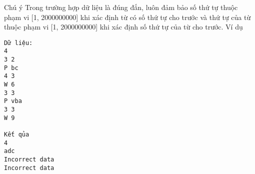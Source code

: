 Chú ý
Trong trường hợp dữ liệu là đúng đắn, luôn đảm bảo số thứ tự thuộc phạm vi [1, 2000000000] khi xác định từ có số thứ tự cho trước và thứ tự của từ thuộc phạm vi [1, 2000000000] khi xác định số thứ tự của từ cho trước.
Ví dụ
\begin{verbatim}
Dữ liệu:
4
3 2
P bc
4 3
W 6
3 3
P vba
3 3
W 9

Kết qủa
4
adc
Incorrect data
Incorrect data
\end{verbatim}